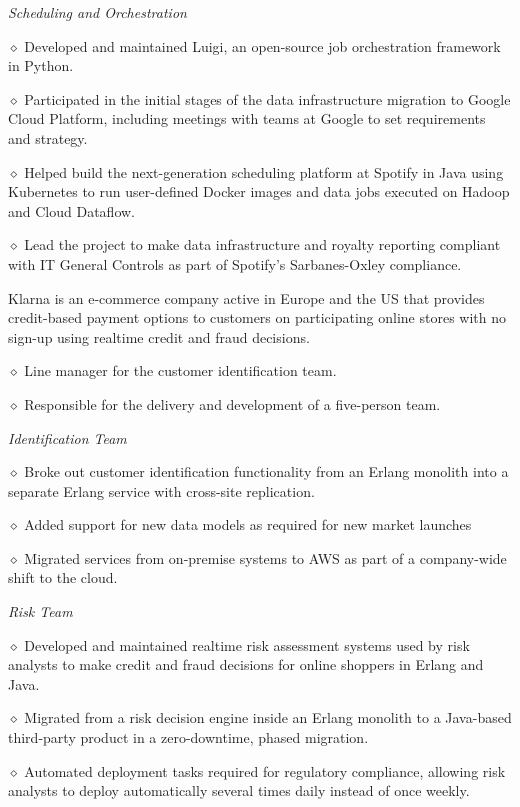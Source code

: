 {\it Scheduling and Orchestration}
\parindent=20pt
\item{$\diamond$} Developed and maintained Luigi, an open-source job orchestration framework in Python.
\item{$\diamond$} Participated in the initial stages of the data infrastructure migration to Google Cloud Platform, including meetings with teams at Google to set requirements and strategy.
\item{$\diamond$} Helped build the next-generation scheduling platform at Spotify in Java using Kubernetes to run user-defined Docker images and data jobs executed on Hadoop and Cloud Dataflow.
\item{$\diamond$} Lead the project to make data infrastructure and royalty reporting compliant with IT General Controls as part of Spotify's Sarbanes-Oxley compliance. 
\parindent=0pt


\bigskip

\smallskip
Klarna is an e-commerce company active in Europe and the US that provides credit-based
payment options to customers on participating online stores with no sign-up using realtime 
credit and fraud decisions.
\smallskip
\parindent=20pt
\item{$\diamond$} Line manager for the customer identification team.
\item{$\diamond$} Responsible for the delivery and development of a five-person team.
\parindent=0pt


\bigskip

\smallskip
{\it Identification Team}
\parindent=20pt
\item{$\diamond$} Broke out customer identification functionality from an Erlang monolith into a separate Erlang service with cross-site replication. 
\item{$\diamond$} Added support for new data models as required for new market launches 
\item{$\diamond$} Migrated services from on-premise systems to AWS as part of a company-wide shift to the cloud.
\parindent=0pt

{\it Risk Team}
\parindent=20pt
\item{$\diamond$} Developed and maintained realtime risk assessment
systems used by risk analysts to make credit and fraud decisions for online shoppers in Erlang and Java.
\item{$\diamond$} Migrated from a risk decision engine inside an Erlang monolith to
a Java-based third-party product in a zero-downtime, phased migration.
\item{$\diamond$} Automated deployment tasks required for regulatory compliance, 
allowing risk analysts to deploy automatically several times daily instead of once 
weekly.
\parindent=0pt

